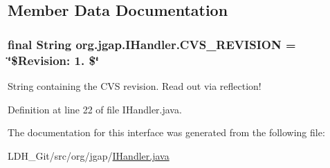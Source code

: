 \subsection{Member Data Documentation}
\hypertarget{interfaceorg_1_1jgap_1_1_i_handler_ac87eeb82b5fb4d6e5ba1f8850db52118}{
\subsubsection[{C\-V\-S\-\_\-\-R\-E\-V\-I\-S\-I\-O\-N}]{\setlength{\rightskip}{0pt plus 5cm}final String org.\-jgap.\-I\-Handler.\-C\-V\-S\-\_\-\-R\-E\-V\-I\-S\-I\-O\-N = \char`\"{}\$Revision\-: 1. \$\char`\"{}\hspace{0.3cm}{\ttfamily [static]}}}\label{interfaceorg_1_1jgap_1_1_i_handler_ac87eeb82b5fb4d6e5ba1f8850db52118}
String containing the C\-V\-S revision. Read out via reflection! 

Definition at line 22 of file I\-Handler.\-java.



The documentation for this interface was generated from the following file\-:\begin{DoxyCompactItemize}
\item 
L\-D\-H\-\_\-\-Git/src/org/jgap/\hyperlink{_i_handler_8java}{I\-Handler.\-java}\end{DoxyCompactItemize}
